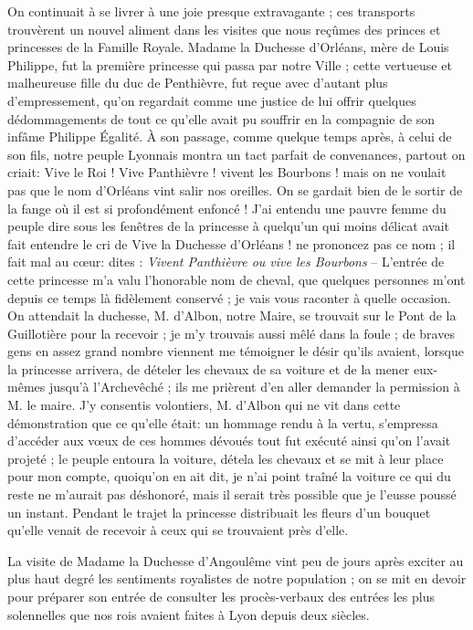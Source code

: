 \documentclass[11pt,a4paper]{report}
\begin{document}
On continuait à se livrer à une joie presque extravagante ; ces transports trouvèrent un nouvel aliment dans les visites que nous reçûmes des princes et princesses de la Famille Royale. Madame la Duchesse d'Orléans, mère de Louis Philippe, fut la première princesse qui passa par notre Ville ; cette vertueuse et malheureuse fille du duc de Penthièvre, fut reçue avec d'autant plus d'empressement, qu'on regardait comme une justice de lui offrir quelques dédommagements de tout ce qu'elle avait pu souffrir en la compagnie de son infâme Philippe Égalité. À son passage, comme quelque temps après, à celui de son fils, notre peuple Lyonnais montra un tact parfait de convenances, partout on criait: Vive le Roi ! Vive Panthièvre ! vivent les Bourbons ! mais on ne voulait pas que le nom d'Orléans vint salir nos oreilles. On se gardait bien de le sortir de la fange où il est si profondément enfoncé ! J'ai entendu une pauvre femme du peuple dire sous les fenêtres de la princesse à quelqu'un qui moins délicat avait fait entendre le cri de Vive la Duchesse d'Orléans ! ne prononcez pas ce nom ; il fait mal au cœur: dites : \textit{Vivent Panthièvre ou vive les Bourbons} -- L'entrée de cette princesse m'a valu l'honorable nom de cheval, que quelques personnes m'ont depuis ce temps là fidèlement conservé ; je vais vous raconter à quelle occasion. On attendait la duchesse, M. d'Albon, notre Maire, se trouvait sur le Pont de la Guillotière pour la recevoir ; je m'y trouvais aussi mêlé dans la foule ; de braves gens en assez grand nombre viennent me témoigner le désir qu'ils avaient, lorsque la princesse arrivera, de dételer les chevaux de sa voiture et de la mener eux-mêmes jusqu'à l'Archevêché ; ils me prièrent d'en aller demander la permission à M. le maire. J'y consentis volontiers, M. d'Albon qui ne vit dans cette démonstration que ce qu'elle était: un hommage rendu à la vertu, s'empressa d'accéder aux vœux de ces hommes dévoués tout fut exécuté ainsi qu'on l'avait projeté ; le peuple entoura la voiture, détela les chevaux et se mit à leur place pour mon compte, quoiqu'on en ait dit, je n'ai point traîné la voiture ce qui du reste ne m'aurait pas déshonoré, mais il serait très possible que je l'eusse poussé un instant. Pendant le trajet la princesse distribuait les fleurs d'un bouquet qu'elle venait de recevoir à ceux qui se trouvaient près d'elle.

La visite de Madame la Duchesse d'Angoulême vint peu de jours après exciter au plus haut degré les sentiments royalistes de notre population ; on se mit en devoir pour préparer son entrée de consulter les procès-verbaux des entrées les plus solennelles que nos rois avaient faites à Lyon depuis deux siècles.
\end{document}
